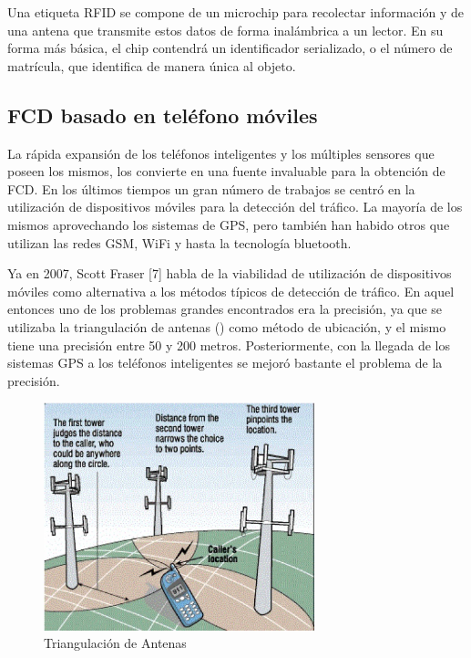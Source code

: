 Una etiqueta RFID se compone de un microchip para recolectar información y de una antena que transmite estos datos de forma inalámbrica a un lector. En su forma más básica, el chip contendrá un identificador serializado, o el número de matrícula, que identifica de manera única al objeto.

\subsection{FCD basado en teléfono móviles}

La rápida expansión de los teléfonos inteligentes y los múltiples sensores que poseen los mismos, los convierte en una fuente invaluable para la obtención de FCD. En los últimos tiempos un gran número de trabajos se centró en la utilización de dispositivos móviles para la detección del tráfico. La mayoría de los mismos aprovechando los sistemas de GPS, pero también han habido otros que utilizan las redes GSM, WiFi y hasta la tecnología bluetooth.

Ya en 2007, Scott Fraser [7] habla de la viabilidad de utilización de dispositivos móviles como alternativa a los métodos típicos de detección de tráfico. En aquel entonces uno de los problemas grandes encontrados era la precisión, ya que se utilizaba la triangulación de antenas () como método de ubicación, y el mismo tiene una precisión entre 50 y 200 metros. Posteriormente, con la llegada de los sistemas GPS a los teléfonos inteligentes se mejoró bastante el problema de la precisión.

\begin{figure}[h]
	\centering
	\includegraphics[width=0.7\textwidth]{capitulos/3/figuras/figura5.jpg}
	\caption{\label{fig:triangulacionAntenas} Triangulación de Antenas}	
\end{figure}

